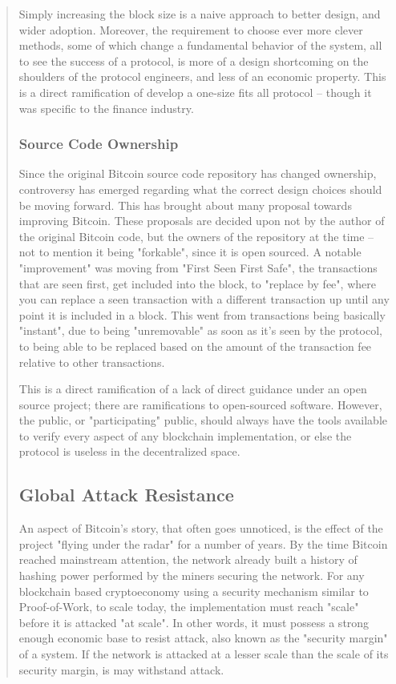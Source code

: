 \documentclass[12pt, titlepage, twocolumn]{report}
\begin{document}
\begin{quotation}
Simply increasing the block size is a naive approach to better design, and wider adoption. Moreover, the requirement to choose ever more clever methods, some of which change a fundamental behavior of the system, all to see the success of a protocol, is more of a design shortcoming on the shoulders of the protocol engineers, and less of an economic property. This is a direct ramification of develop a one-size fits all protocol -- though it was specific to the finance industry. 

\subsubsection{Source Code Ownership}
Since the original Bitcoin source code repository has changed ownership, controversy has emerged regarding what the correct design choices should be moving forward. This has brought about many proposal towards improving Bitcoin. These proposals are decided upon not by the author of the original Bitcoin code, but the owners of the repository at the time -- not to mention it being "forkable", since it is open sourced. A notable "improvement" was moving from "First Seen First Safe", the transactions that are seen first, get included into the block, to "replace by fee", where you can replace a seen transaction with a different transaction up until any point it is included in a block. This went from transactions being basically "instant", due to being "unremovable" as soon as it's seen by the protocol, to being able to be replaced based on the amount of the transaction fee relative to other transactions.

This is a direct ramification of a lack of direct guidance under an open source project; there are ramifications to open-sourced software. However, the public, or "participating" public, should always have the tools available to verify every aspect of any blockchain implementation, or else the protocol is useless in the decentralized space.


\subsection{Global Attack Resistance}
An aspect of Bitcoin's story, that often goes unnoticed, is the effect of the project "flying under the radar" for a number of years. By the time Bitcoin reached mainstream attention, the network already built a history of hashing power performed by the miners securing the network. For any blockchain based cryptoeconomy using a security mechanism similar to Proof-of-Work, to scale today, the implementation must reach "scale" before it is attacked "at scale". In other words, it must possess a strong enough economic base to resist attack, also known as the "security margin" of a system. If the network is attacked at a lesser scale than the scale of its security margin, is may withstand attack.


\end{quotation}
\end{document}
